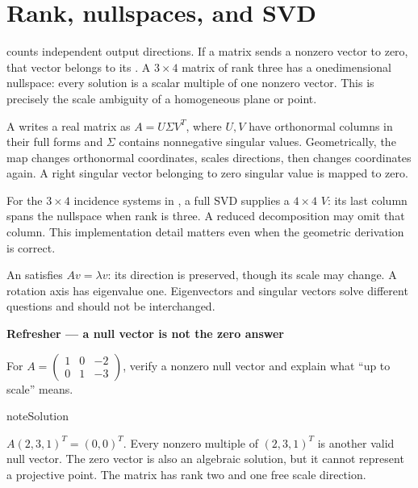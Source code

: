 \documentclass[letterpaper,11pt,english,openany,oneside]{jupyterBook}
\begin{document}
\section{Rank, nullspaces, and SVD}
\label{\detokenize{foundations/prerequisites:rank-nullspaces-and-svd}}
\sphinxAtStartPar
{} counts independent output directions. If a matrix sends a nonzero vector to zero, that vector belongs to its . A \(3\times4\) matrix of rank three has a one\sphinxhyphen{}dimensional nullspace: every solution is a scalar multiple of one nonzero vector. This is precisely the scale ambiguity of a homogeneous plane or point.

\sphinxAtStartPar
A  writes a real matrix as \(A=U\Sigma V^T\), where \(U,V\) have orthonormal columns in their full forms and \(\Sigma\) contains nonnegative singular values. Geometrically, the map changes orthonormal coordinates, scales directions, then changes coordinates again. A right singular vector belonging to zero singular value is mapped to zero.

\sphinxAtStartPar
For the \(3\times4\) incidence systems in {\hyperref[\detokenize{lectures/lecture01/planes-lines:lec01-planes}]{}}, a full SVD supplies a \(4\times4\) \(V\): its last column spans the nullspace when rank is three. A reduced decomposition may omit that column. This implementation detail matters even when the geometric derivation is correct.

\sphinxAtStartPar
An  satisfies \(Av=\lambda v\): its direction is preserved, though its scale may change. A rotation axis has eigenvalue one. Eigenvectors and singular vectors solve different questions and should not be interchanged.

\begin{TextbookBox}
\textbf{Refresher — a null vector is not the zero answer}\par\smallskip

\sphinxAtStartPar
For \(A=\begin{pmatrix}1&0&-2\\0&1&-3\end{pmatrix}\), verify a nonzero null vector and explain what “up to scale” means.

\end{TextbookBox}

\begin{sphinxadmonition}{note}{Solution}

\sphinxAtStartPar
\(A(2,3,1)^T=(0,0)^T\). Every nonzero multiple of \((2,3,1)^T\) is another valid null vector. The zero vector is also an algebraic solution, but it cannot represent a projective point. The matrix has rank two and one free scale direction.
\end{sphinxadmonition}
\end{document}
